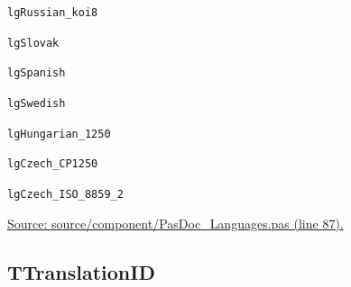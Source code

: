 \documentclass{report}
\newif\ifpdf
\begin{document}
\begin{list}{}
\begin{description}
\item[\texttt{lgRussian{\_}koi8}] \label{PasDoc_Languages-lgRussian_koi8}
\index{}
 
\item[\texttt{lgSlovak}] \label{PasDoc_Languages-lgSlovak}
\index{}
 
\item[\texttt{lgSpanish}] \label{PasDoc_Languages-lgSpanish}
\index{}
 
\item[\texttt{lgSwedish}] \label{PasDoc_Languages-lgSwedish}
\index{}
 
\item[\texttt{lgHungarian{\_}1250}] \label{PasDoc_Languages-lgHungarian_1250}
\index{}
 
\item[\texttt{lgCzech{\_}CP1250}] \label{PasDoc_Languages-lgCzech_CP1250}
\index{}
 
\item[\texttt{lgCzech{\_}ISO{\_}8859{\_}2}] \label{PasDoc_Languages-lgCzech_ISO_8859_2}
\index{}
 
\end{description}
\par
\href{https://github.com/pasdoc/pasdoc/blob/master/source/component/PasDoc_Languages.pas#L87}{Source: source/component/PasDoc{\_}Languages.pas (line 87).}

\end{list}
\ifpdf
\subsection*{\large{\textbf{TTranslationID}}\normalsize\hspace{1ex}\hrulefill}
\else
\end{document}
